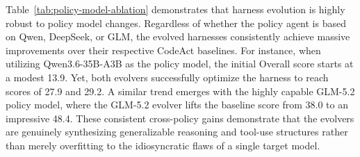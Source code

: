 Table~\ref{tab:policy-model-ablation} demonstrates that harness evolution is highly robust to policy model changes. Regardless of whether the policy agent is based on Qwen, DeepSeek, or GLM, the evolved harnesses consistently achieve massive improvements over their respective CodeAct baselines. For instance, when utilizing Qwen3.6-35B-A3B as the policy model, the initial Overall score starts at a modest 13.9. Yet, both evolvers successfully optimize the harness to reach scores of 27.9 and 29.2. A similar trend emerges with the highly capable GLM-5.2 policy model, where the GLM-5.2 evolver lifts the baseline score from 38.0 to an impressive 48.4. These consistent cross-policy gains demonstrate that the evolvers are genuinely synthesizing generalizable reasoning and tool-use structures rather than merely overfitting to the idiosyncratic flaws of a single target model.





